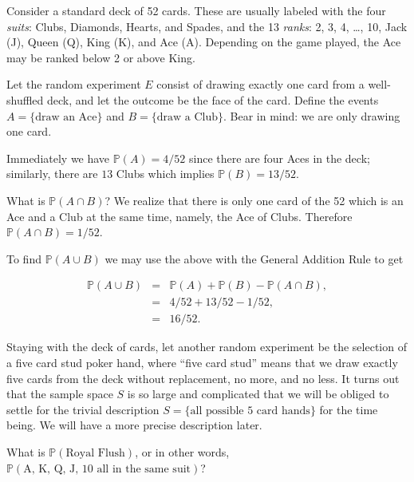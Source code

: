 \documentclass[]{book}
\numberwithin{equation}{chapter}
\numberwithin{figure}{chapter}
\theoremstyle{plain}
\theoremstyle{definition}
\theoremstyle{remark}
\theoremstyle{definition}
\theoremstyle{definition}
\theoremstyle{remark}
\let\BeginKnitrBlock\begin \let\EndKnitrBlock\end
\begin{document}
\bigskip

\BeginKnitrBlock{example}
\protect\hypertarget{ex:unnamed-chunk-125}{}{\label{ex:unnamed-chunk-125}}Consider
a standard deck of 52 cards. These are usually labeled with the four
\emph{suits}: Clubs, Diamonds, Hearts, and Spades, and the 13
\emph{ranks}: 2, 3, 4, \ldots{}, 10, Jack (J), Queen (Q), King (K), and
Ace (A). Depending on the game played, the Ace may be ranked below 2 or
above King.
\EndKnitrBlock{example}

Let the random experiment \(E\) consist of drawing exactly one card from
a well-shuffled deck, and let the outcome be the face of the card.
Define the events \(A = \{ \mbox{draw an Ace} \}\) and
\(B = \{ \mbox{draw a Club} \}\). Bear in mind: we are only drawing one
card.

Immediately we have \(\mathbb{P}(A) = 4/52\) since there are four Aces
in the deck; similarly, there are \(13\) Clubs which implies
\(\mathbb{P}(B) = 13/52\).

What is \(\mathbb{P}(A\cap B)\)? We realize that there is only one card
of the 52 which is an Ace and a Club at the same time, namely, the Ace
of Clubs. Therefore \(\mathbb{P}(A\cap B)=1/52\).

To find \(\mathbb{P}(A\cup B)\) we may use the above with the General
Addition Rule to get

\begin{eqnarray*}
\mathbb{P}(A\cup B) & = & \mathbb{P}(A) + \mathbb{P}(B) - \mathbb{P}(A \cap B),\\
 & = & 4/52 + 13/52 - 1/52,\\
 & = & 16/52.
\end{eqnarray*}

\bigskip

\BeginKnitrBlock{example}
\protect\hypertarget{ex:unnamed-chunk-126}{}{\label{ex:unnamed-chunk-126}}Staying
with the deck of cards, let another random experiment be the selection
of a five card stud poker hand, where ``five card stud'' means that we
draw exactly five cards from the deck without replacement, no more, and
no less. It turns out that the sample space \(S\) is so large and
complicated that we will be obliged to settle for the trivial
description \(S = \{ \mbox{all possible 5 card hands} \}\) for the time
being. We will have a more precise description later.
\EndKnitrBlock{example}

What is \(\mathbb{P}(\mbox{Royal Flush})\), or in other words,
\(\mathbb{P}(\mbox{A, K, Q, J, 10 all in the same suit})\)?
\end{document}

